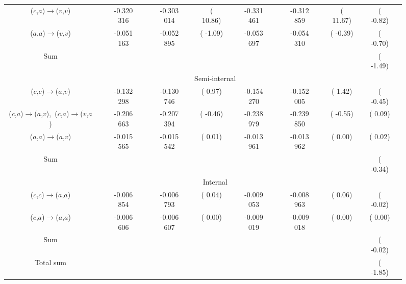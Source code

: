 \documentclass[aip,jcp,amsmath]{revtex4-1}
\begin{document}
{\begin{figure}
\begin{longtable}[!ht]{cccccccccccccccc}
($c$,$a$)$\rightarrow$($v$,$v$)                                   && -0.320 316  && -0.303 014  && ( 10.86)  && -0.331 461  && -0.312 859  && ( 11.67) && ( -0.82)\\
($a$,$a$)$\rightarrow$($v$,$v$)                                   && -0.051 163  && -0.052 895  && ( -1.09)  && -0.053 697  && -0.054 310  && ( -0.39) && ( -0.70)\\
Sum                                                               &&             &&             &&           &&             &&             &&          && ( -1.49)\\
                                                                                                                                          
                                                                  && \multicolumn{10}{c}{Semi-internal} \\                 
($c$,$c$)$\rightarrow$($a$,$v$)                                   && -0.132 298  && -0.130 746  && (  0.97)  && -0.154 270  && -0.152 005  && (  1.42) && ( -0.45)\\
($c$,$a$)$\rightarrow$($a$,$v$),\ ($c$,$a$)$\rightarrow$($v$,$a$) && -0.206 663  && -0.207 394  && ( -0.46)  && -0.238 979  && -0.239 850  && ( -0.55) && (  0.09)\\
($a$,$a$)$\rightarrow$($a$,$v$)                                   && -0.015 565  && -0.015 542  && (  0.01)  && -0.013 961  && -0.013 962  && (  0.00) && (  0.02)\\
Sum                                                               &&             &&             &&           &&             &&             &&          && ( -0.34)\\
                                                                  && \multicolumn{10}{c}{Internal} \\                      
($c$,$c$)$\rightarrow$($a$,$a$)                                   && -0.006 854  && -0.006 793  && (  0.04)  && -0.009 053  && -0.008 963  && (  0.06) && ( -0.02)\\
($c$,$a$)$\rightarrow$($a$,$a$)                                   && -0.006 606  && -0.006 607  && (  0.00)  && -0.009 019  && -0.009 018  && (  0.00) && (  0.00)\\
Sum                                                               &&             &&             &&           &&             &&             &&          && ( -0.02)\\
Total sum                                                         &&             &&             &&           &&             &&             &&          && ( -1.85)\\
\hline
\hline
\end{longtable}
\end{figure}  

}
\end{document}
